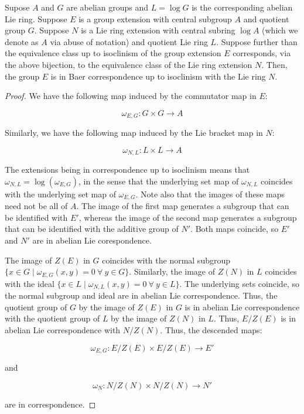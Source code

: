 \documentclass{ucetd}
\begin{document}
\begin{lemma}\label{lemma:bcuti-extensions-implies-bcuti}
  Supose $A$ and $G$ are abelian groups and $L = \log G$ is the
  corresponding abelian Lie ring. Suppose $E$ is a group extension
  with central subgroup $A$ and quotient group $G$. Suppose $N$ is a
  Lie ring extension with central subring $\log A$ (which we denote as
  $A$ via abuse of notation) and quotient Lie ring $L$. Suppose
  further than the equivalence class up to isoclinism of the group
  extension $E$ corresponds, via the above bijection, to the
  equivalence class of the Lie ring extension $N$. Then, the group $E$
  is in Baer correspondence up to isoclinism with the Lie ring $N$.
\end{lemma}

\begin{proof}
  We have the following map induced by the commutator map in $E$:

  $$\omega_{E,G}: G \times G \to A$$

  Similarly, we have the following map induced by the Lie bracket map
  in $N$:

  $$\omega_{N,L}: L \times L \to A$$

  The extensions being in correspondence up to isoclinism means that
  $\omega_{N,L} = \log(\omega_{E,G})$, in the sense that the underlying set
  map of $\omega_{N,L}$ coincides with the underlying set map of
  $\omega_{E,G}$. Note also that the images of these maps need not be all
  of $A$. The image of the first map generates a subgroup that can be
  identified with $E'$, whereas the image of the second map generates
  a subgroup that can be identified with the additive group of
  $N'$. Both maps coincide, so $E'$ and $N'$ are in abelian Lie
  corespondence.

  The image of $Z(E)$ in $G$ coincides with the normal subgroup $\{ x
  \in G \mid \omega_{E,G}(x,y) = 0 \ \forall \ y \in G\}$. Similarly,
  the image of $Z(N)$ in $L$ coincides with the ideal $\{ x \in L \mid
  \omega_{N,L}(x,y) = 0 \ \forall \ y \in L \}$. The underlying sets
  coincide, so the normal subgroup and ideal are in abelian Lie
  correspondence. Thus, the quotient group of $G$ by the image of
  $Z(E)$ in $G$ is in abelian Lie correspondence with the quotient
  group of $L$ by the image of $Z(N)$ in $L$. Thus, $E/Z(E)$ is in
  abelian Lie correspondence with $N/Z(N)$. Thus, the descended maps:

  $$\omega_{E,G}: E/Z(E) \times E/Z(E) \to E'$$

  and

  $$\omega_N: N/Z(N) \times N/Z(N) \to N'$$

  are in correspondence.
\end{proof}
\end{document}
